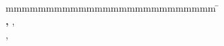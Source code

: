 \begin{titlepage}
\begin{center}
		\vspace*{3mm}		{\textbf \abschluss}\\
		\vspace*{12mm}	\langartikelstudiengang{} \langstudiengang{} \studiengang\\
    \vspace*{3mm}		\langanderdh{} \dhbw\\
		\vspace*{12mm}	\langvon\\
		\vspace*{3mm}		{\large\textbf \autor}\\
		\vspace*{12mm}	\datumAbgabe\\
	\end{center}
	\vfill
	\begin{spacing}{1.2}
	\begin{tabbing}
		mmmmmmmmmmmmmmmmmmmmmmmmmm             \= \kill
		\textbf{\langdbbearbeitungszeit}       \>  \zeitraum\\
		\textbf{\langdbmatriknr, \langdbkurs}  \>  \martrikelnr, \kurs\\
		\textbf{\langdbfirma}                  \>  \firma, \firmenort\\
		\textbf{\langdbbetreuer}               \>  \betreuer\\
	\end{tabbing}
	\end{spacing}
\end{titlepage}
